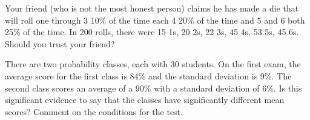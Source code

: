 \begin{exe} Your friend (who is not the most honest person) claims he has made a die that will roll one through 3 10\% of the time each 4 20\% of the time and 5 and 6 both 25\% of the time.  In 200 rolls, there were 15 1s, 20 2s, 22 3s, 45 4s, 53 5s, 45 6s. Should you trust your friend? \end{exe}

\begin{exe} There are two probability classes, each with 30 students.  On the first exam, the average score for the first class is 84\% and the standard deviation is 9\%.  The second class scores an average of a 90\% with a standard deviation of 6\%.  Is this significant evidence to say that the classes have significantly different mean scores?  Comment on the conditions for the test. \end{exe}

